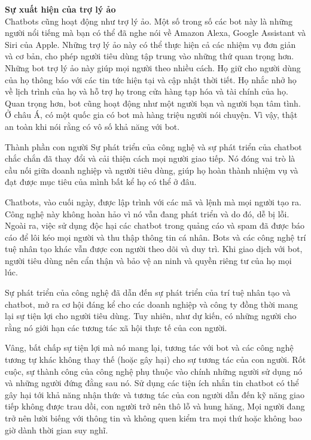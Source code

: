 \textbf{Sự xuất hiện của trợ lý ảo} \\[0.2em]
Chatbots cũng hoạt động như trợ lý ảo. Một số trong số các bot này là những người nổi tiếng mà bạn có thể đã nghe nói về Amazon Alexa, Google Assistant và Siri của Apple. Những trợ lý ảo này có thể thực hiện cả các nhiệm vụ đơn giản và cơ bản, cho phép người tiêu dùng tập trung vào những thứ quan trọng hơn.
Những bot trợ lý ảo này giúp mọi người theo nhiều cách. Họ giữ cho người dùng của họ thông báo với các tin tức hiện tại và cập nhật thời tiết. Họ nhắc nhở họ về lịch trình của họ và hỗ trợ họ trong cửa hàng tạp hóa và tài chính của họ. Quan trọng hơn, bot cũng hoạt động như một người bạn và người bạn tâm tình. Ở châu Á, có một quốc gia có bot mà hàng triệu người nói chuyện. Vì vậy, thật an toàn khi nói rằng có vô số khả năng với bot.

Thành phần con người
Sự phát triển của công nghệ và sự phát triển của chatbot chắc chắn đã thay đổi và cải thiện cách mọi người giao tiếp. Nó đóng vai trò là cầu nối giữa doanh nghiệp và người tiêu dùng, giúp họ hoàn thành nhiệm vụ và đạt được mục tiêu của mình bất kể họ có thể ở đâu.

Chatbots, vào cuối ngày, được lập trình với các mã và lệnh mà mọi người tạo ra. Công nghệ này không hoàn hảo vì nó vẫn đang phát triển và do đó, dễ bị lỗi. Ngoài ra, việc sử dụng độc hại các chatbot trong quảng cáo và spam đã được báo cáo để lôi kéo mọi người và thu thập thông tin cá nhân.
Bots và các công nghệ trí tuệ nhân tạo khác vẫn được con người theo dõi và duy trì. Khi giao dịch với bot, người tiêu dùng nên cẩn thận và bảo vệ an ninh và quyền riêng tư của họ mọi lúc.

Sự phát triển của công nghệ đã dẫn đến sự phát triển của trí tuệ nhân tạo và chatbot, mở ra cơ hội đáng kể cho các doanh nghiệp và công ty đồng thời mang lại sự tiện lợi cho người tiêu dùng. Tuy nhiên, như dự kiến, có những người cho rằng nó giới hạn các tương tác xã hội thực tế của con người.

Vâng, bất chấp sự tiện lợi mà nó mang lại, tương tác với bot và các công nghệ tương tự khác không thay thế (hoặc gây hại) cho sự tương tác của con người. Rốt cuộc, sự thành công của công nghệ phụ thuộc vào chính những người sử dụng nó và những người đứng đằng sau nó.
Sử dụng các tiện ích nhắn tin chatbot có thể gây hại tới khả năng nhận thức và tương tác của con người dẫn đến kỹ năng giao tiếp không được trau dồi, con người trở nên thô lỗ và hung hăng,
Mọi người đang trở nên lười biếng với thông tin và không quen kiểm tra mọi thứ hoặc không bao giờ dành thời gian suy nghĩ.
